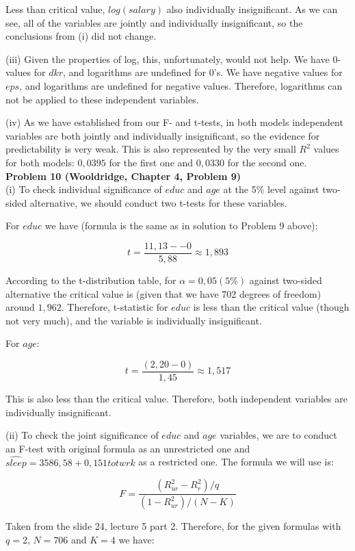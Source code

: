 \documentclass{article}
\begin{document}
Less than critical value, $log(salary)$ also individually insignificant. As we can see, all of the variables are jointly and individually insignificant, so the conclusions from (i) did not change.

(iii) Given the properties of log, this, unfortunately, would not help. We have 0-values for $dkr$, and logarithms are undefined for 0's. We have negative values for $eps$, and logarithms are undefined for negative values. Therefore, logarithms can not be applied to these independent variables.  

(iv) As we have established from our F- and t-tests, in both models independent variables are both jointly and individually insignificant, so the evidence for predictability is very weak. This is also represented by the very small $R^2$ values for both models: $0,0395$ for the first one and $0,0330$ for the second one.
\\

\textbf{Problem 10 (Wooldridge, Chapter 4, Problem 9)}
\\

(i) To check individual significance of $educ$ and $age$ at the 5\% level against two-sided alternative, we should conduct two t-tests for these variables. 

For $educ$ we have (formula is the same as in solution to Problem 9 above):

$$t = \frac{11,13 - -0}{5,88} \approx 1,893$$

According to the t-distribution table, for $\alpha = 0,05 (5\%)$ against two-sided alternative the critical value is (given that we have 702 degrees of freedom) around $1,962$. Therefore, t-statistic for $educ$ is less than the critical value (though not very much), and the variable is individually insignificant. 

For $age$:

$$t = \frac{(2,20 - 0)}{1,45} \approx 1,517$$

This is also less than the critical value. Therefore, both independent variables are individually insignificant. 

(ii) To check the joint significance of $educ$ and $age$ variables, we are to conduct an F-test with original formula as an unrestricted one and $\widehat{sleep} = 3586,58 + 0,151 totwrk$ as a restricted one. The formula we will use is:

$$F = \frac{(R^{2}_{ur} - R^{2}_{r}) / q}{(1 - R^{2}_{ur}) / (N - K)}$$

Taken from the slide 24, lecture 5 part 2. Therefore, for the given formulas with $q = 2$, $N = 706$ and $K = 4$ we have:
\end{document}
